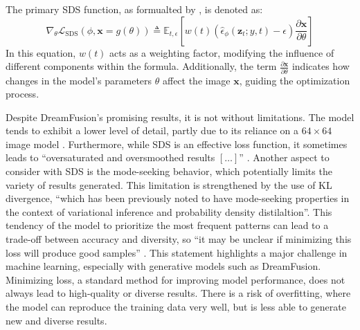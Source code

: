 The primary SDS function, as formualted by \citeauthor{pooleDreamfusion}, is denoted as:~\[
\nabla_{\theta}\mathcal{L}_{\text{SDS}}(\phi,\mathbf{x}=g(\theta))\triangleq\mathbb{E}_{t,\epsilon}\left[w(t)\left(\hat{\epsilon}_{\phi}({\mathbf{z}}_{t};y,t)-\epsilon\right){\frac{\partial\mathbf{x}}{\partial\theta}}\right]
\] In this equation, \( w(t) \) acts as a weighting factor, modifying the influence of different components within the formula. Additionally, the term \( \frac{\partial\mathbf{x}}{\partial\theta} \) indicates how changes in the model's parameters \( \theta \) affect the image \( \mathbf{x} \), guiding the optimization process.

Despite DreamFusion's promising results, it is not without limitations. The model tends to exhibit a lower level of detail, partly due to its reliance on a \( 64 \times 64 \) image model \citep{lin2023magic3d}. Furthermore, while SDS is an effective loss function, it sometimes leads to ``oversaturated and oversmoothed results \([\ldots]\)'' \citep{pooleDreamfusion}. Another aspect to consider with SDS is the mode-seeking behavior, which potentially limits the variety of results generated. This limitation is strengthened by the use of KL divergence, ``which has been previously noted to have mode-seeking properties in the context of variational inference and probability density distilaltion''\citep{pooleDreamfusion}. This tendency of the model to prioritize the most frequent patterns can lead to a trade-off between accuracy and diversity, so ``it may be unclear if minimizing this loss will produce good samples'' \citep{pooleDreamfusion}. This statement highlights a major challenge in machine learning, especially with generative models such as DreamFusion. Minimizing loss, a standard method for improving model performance, does not always lead to high-quality or diverse results. There is a risk of overfitting, where the model can reproduce the training data very well, but is less able to generate new and diverse results.